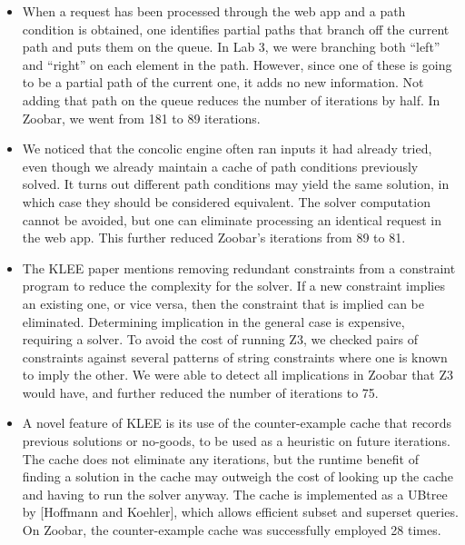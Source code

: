 \documentclass{scrartcl}
\begin{document}
\begin{itemize}
\item When a request has been processed through the web app and a path
condition is obtained, one identifies partial paths that branch off the
current path and puts them on the queue. In Lab 3, we were branching
both ``left'' and ``right'' on each element in the path. However, since
one of these is going to be a partial path of the current one, it adds
no new information. Not adding that path on the queue reduces the number
of iterations by half. In Zoobar, we went from 181 to 89 iterations.

\item We noticed that the concolic engine often ran inputs it had
already tried, even though we already maintain a cache of path
conditions previously solved. It turns out different path conditions
may yield the same solution, in which case they should be considered
equivalent. The solver computation cannot be avoided, but one can
eliminate processing an identical request in the web app. This further
reduced Zoobar's iterations from 89 to 81.

\item The KLEE paper mentions removing redundant constraints from a
constraint program to reduce the complexity for the solver. If a new
constraint implies an existing one, or vice versa, then the constraint
that is implied can be eliminated.
Determining implication in the general case is expensive, requiring a
solver. To avoid the cost of running Z3, we checked pairs of constraints
against several patterns of string constraints where one is known to
imply the other. We were able to detect all implications in Zoobar that
Z3 would have, and further reduced the number of iterations to 75.

\item A novel feature of KLEE is its use of the counter-example cache
that records previous solutions or no-goods, to be used as a heuristic
on future iterations. The cache does not eliminate any iterations, but
the runtime benefit of finding a solution in the cache may outweigh the
cost of looking up the cache and having to run the solver anyway.
The cache is implemented as a UBtree by [Hoffmann and Koehler],
which allows efficient subset and superset queries. On Zoobar, the
counter-example cache was successfully employed 28 times.
\end{itemize}
\end{document}
